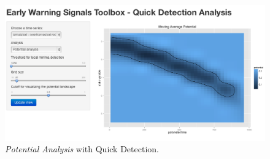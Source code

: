 \documentclass[12pt,a4paper,final]{article}
\begin{document}
\begin{doublespacing}
\begin{figure}[ht]
\begin{center}
\includegraphics[scale=0.4]{demo_potential.png}
\caption{\textit{Potential Analysis} with Quick Detection.}
\end{center}
\end{figure}

\end{doublespacing}
\end{document}
